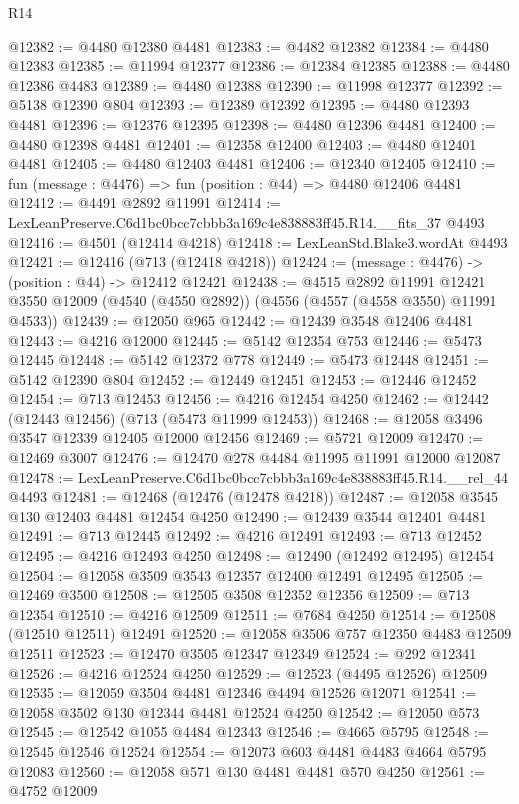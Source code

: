 \begin{lexlean}{R14}
\begin{coremodule}
@12382 := @4480 @12380 @4481
@12383 := @4482 @12382
@12384 := @4480 @12383
@12385 := @11994 @12377
@12386 := @12384 @12385
@12388 := @4480 @12386 @4483
@12389 := @4480 @12388
@12390 := @11998 @12377
@12392 := @5138 @12390 @804
@12393 := @12389 @12392
@12395 := @4480 @12393 @4481
@12396 := @12376 @12395
@12398 := @4480 @12396 @4481
@12400 := @4480 @12398 @4481
@12401 := @12358 @12400
@12403 := @4480 @12401 @4481
@12405 := @4480 @12403 @4481
@12406 := @12340 @12405
@12410 := fun (message : @4476) => fun (position : @44) => @4480 @12406 @4481
@12412 := @4491 @2892 @11991
@12414 := LexLeanPreserve.C6d1bc0bcc7cbbb3a169c4e838883ff45.R14.__fits_37 @4493
@12416 := @4501 (@12414 @4218)
@12418 := LexLeanStd.Blake3.wordAt @4493
@12421 := @12416 (@713 (@12418 @4218))
@12424 := (message : @4476) -> (position : @44) -> @12412 @12421
@12438 := @4515
    @2892
    @11991
    @12421
    @3550
    @12009
    (@4540 (@4550 @2892))
    (@4556 (@4557 (@4558 @3550) @11991 @4533))
@12439 := @12050 @965
@12442 := @12439 @3548 @12406 @4481
@12443 := @4216 @12000
@12445 := @5142 @12354 @753
@12446 := @5473 @12445
@12448 := @5142 @12372 @778
@12449 := @5473 @12448
@12451 := @5142 @12390 @804
@12452 := @12449 @12451
@12453 := @12446 @12452
@12454 := @713 @12453
@12456 := @4216 @12454 @4250
@12462 := @12442 (@12443 @12456) (@713 (@5473 @11999 @12453))
@12468 := @12058 @3496 @3547 @12339 @12405 @12000 @12456
@12469 := @5721 @12009
@12470 := @12469 @3007
@12476 := @12470 @278 @4484 @11995 @11991 @12000 @12087
@12478 := LexLeanPreserve.C6d1bc0bcc7cbbb3a169c4e838883ff45.R14.__rel_44 @4493
@12481 := @12468 (@12476 (@12478 @4218))
@12487 := @12058 @3545 @130 @12403 @4481 @12454 @4250
@12490 := @12439 @3544 @12401 @4481
@12491 := @713 @12445
@12492 := @4216 @12491
@12493 := @713 @12452
@12495 := @4216 @12493 @4250
@12498 := @12490 (@12492 @12495) @12454
@12504 := @12058 @3509 @3543 @12357 @12400 @12491 @12495
@12505 := @12469 @3500
@12508 := @12505 @3508 @12352 @12356
@12509 := @713 @12354
@12510 := @4216 @12509
@12511 := @7684 @4250
@12514 := @12508 (@12510 @12511) @12491
@12520 := @12058 @3506 @757 @12350 @4483 @12509 @12511
@12523 := @12470 @3505 @12347 @12349
@12524 := @292 @12341
@12526 := @4216 @12524 @4250
@12529 := @12523 (@4495 @12526) @12509
@12535 := @12059 @3504 @4481 @12346 @4494 @12526 @12071
@12541 := @12058 @3502 @130 @12344 @4481 @12524 @4250
@12542 := @12050 @573
@12545 := @12542 @1055 @4484 @12343
@12546 := @4665 @5795
@12548 := @12545 @12546 @12524
@12554 := @12073 @603 @4481 @4483 @4664 @5795 @12083
@12560 := @12058 @571 @130 @4481 @4481 @570 @4250
@12561 := @4752 @12009

\end{coremodule}
\end{lexlean}
